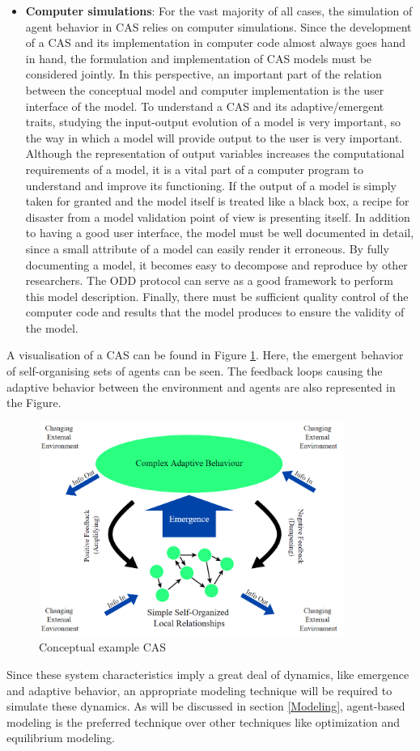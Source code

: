 \begin{itemize}
    \item \textbf{Computer simulations}: For the vast majority of all cases, the simulation of agent behavior in CAS relies on computer simulations. Since the development of a CAS and its implementation in computer code almost always goes hand in hand, the formulation and implementation of CAS models must be considered jointly. In this perspective, an important part of the relation between the conceptual model and computer implementation is the user interface of the model. To understand a CAS and its adaptive/emergent traits, studying the input-output evolution of a model is very important, so the way in which a model will provide output to the user is very important. Although the representation of output variables increases the computational requirements of a model, it is a vital part of a computer program to understand and improve its functioning. If the output of a model is simply taken for granted and the model itself is treated like a black box, a recipe for disaster from a model validation point of view is presenting itself. In addition to having a good user interface, the model must be well documented in detail, since a small attribute of a model can easily render it erroneous. By fully documenting a model, it becomes easy to decompose and reproduce by other researchers. The ODD protocol can serve as a good framework to perform this model description. Finally, there must be sufficient quality control of the computer code and results that the model produces to ensure the validity of the model.
\end{itemize}
A visualisation of a CAS can be found in Figure \ref{Figure:CASS}. Here, the emergent behavior of self-organising sets of agents can be seen. The feedback loops causing the adaptive behavior between the environment and agents are also represented in the Figure.
\newline 
\begin{figure}[h!]
\centering
\includegraphics[width=10cm]{Complex_adaptive_system.png}
\caption[Conceptual example CAS]{Conceptual example CAS \cite{CAsexample}}
\label{Figure:CASS}
\end{figure}
\newline \noindent
Since these system characteristics imply a great deal of dynamics, like emergence and adaptive behavior, an appropriate modeling technique will be required to simulate these dynamics. As will be discussed in section \ref{Modeling}, agent-based modeling is the preferred technique over other techniques like optimization and equilibrium modeling.
 

